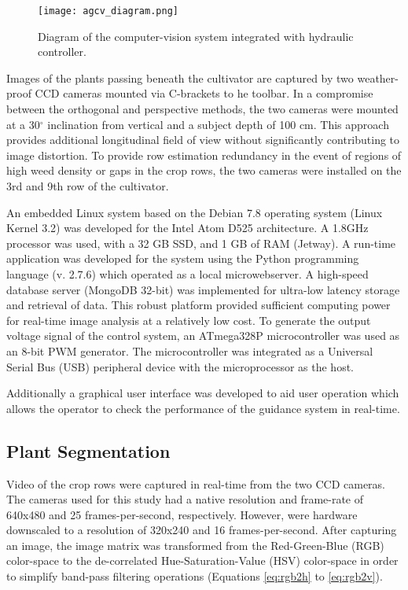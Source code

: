 \begin{figure}
  \centering
  \texttt{[image: agcv\_diagram.png]}
  \caption{Diagram of the computer-vision system integrated with hydraulic controller.}
\end{figure}

Images of the plants passing beneath the cultivator are captured by
two weather-proof CCD cameras mounted via C-brackets to he toolbar. 
In a compromise between the orthogonal and perspective
methods, the two cameras were mounted at a 30$^{\circ}$ inclination from
vertical and a subject depth of 100 cm. This approach provides
additional longitudinal field of view without significantly
contributing to image distortion. To provide row estimation redundancy
in the event of regions of high weed density or gaps in the crop rows,
the two cameras were installed on the 3rd and 9th row of the
cultivator.

An embedded Linux system based on the Debian 7.8 operating system
(Linux Kernel 3.2) was developed for the Intel Atom D525
architecture. A 1.8GHz processor was used, with a 32 GB SSD, and 1 GB
of RAM (Jetway). A run-time application was developed for the system
using the Python programming language (v. 2.7.6) which operated as a
local microwebserver. A high-speed database server (MongoDB 32-bit)
was implemented for ultra-low latency storage and retrieval of
data. This robust platform provided sufficient computing power for
real-time image analysis at a relatively low cost. To generate the
output voltage signal of the control system, an
ATmega328P microcontroller was used as an 8-bit PWM generator. The
microcontroller was integrated as a Universal Serial Bus (USB)
peripheral device with the microprocessor as the host. 

Additionally a graphical user interface was developed to aid user
operation which allows the operator to check the performance of the
guidance system in real-time.

\subsection{Plant Segmentation}
Video of the crop rows were captured in real-time from the two CCD
cameras. The cameras used for this study had a native resolution and
frame-rate of 640x480 and 25 frames-per-second, respectively. However,
were hardware downscaled to a resolution of 320x240 and 16
frames-per-second. After capturing an image, the image matrix was
transformed from the Red-Green-Blue (RGB) color-space to the
de-correlated Hue-Saturation-Value (HSV) color-space in order to
simplify band-pass filtering operations (Equations \ref{eq:rgb2h} to \ref{eq:rgb2v}).

